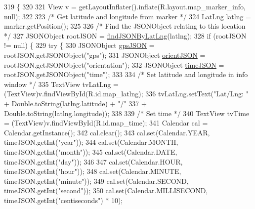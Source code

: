 \begin{DoxyCode}
319                                                    \{
320 
321             View v =  getLayoutInflater().inflate(R.layout.map\_marker\_info, null);
322 
323             \textcolor{comment}{/* Get latitude and longitude from marker */}
324             LatLng latlng = marker.getPosition();
325 
326             \textcolor{comment}{/* Find the JSONObject relating to this location */}
327             JSONObject rootJSON = \hyperlink{class_android_app_1_1_maps_activity_a18364d9334710362b1e6c39502353927}{findJSONByLatLng}(latlng);
328             \textcolor{keywordflow}{if} (rootJSON != null) \{
329                 \textcolor{keywordflow}{try} \{
330                     JSONObject \hyperlink{logging-device_8ino_a548727e041a5cd3db91bdbd0ccd71e30}{gpsJSON} = rootJSON.getJSONObject(\textcolor{stringliteral}{"gps"});
331                     JSONObject \hyperlink{logging-device_8ino_ae8e95a76df2aaa373792e5b744a6bb73}{orientJSON} = rootJSON.getJSONObject(\textcolor{stringliteral}{"orientation"});
332                     JSONObject \hyperlink{logging-device_8ino_acc172a29cb5ff709b48b650d9fb6503c}{timeJSON} = rootJSON.getJSONObject(\textcolor{stringliteral}{"time"});
333 
334                     \textcolor{comment}{/* Set latitude and longitude in info window */}
335                     TextView tvLatLng = (TextView)v.findViewById(R.id.map\_latlng);
336                     tvLatLng.setText(\textcolor{stringliteral}{"Lat/Lng: "} + Double.toString(latlng.latitude) + \textcolor{stringliteral}{"/"}
337                             + Double.toString(latlng.longitude));
338 
339                     \textcolor{comment}{/* Set time */}
340                     TextView tvTime = (TextView)v.findViewById(R.id.map\_time);
341                     Calendar cal = Calendar.getInstance();
342                     cal.clear();
343                     cal.set(Calendar.YEAR, timeJSON.getInt(\textcolor{stringliteral}{"year"}));
344                     cal.set(Calendar.MONTH, timeJSON.getInt(\textcolor{stringliteral}{"month"}));
345                     cal.set(Calendar.DATE, timeJSON.getInt(\textcolor{stringliteral}{"day"}));
346 
347                     cal.set(Calendar.HOUR, timeJSON.getInt(\textcolor{stringliteral}{"hour"}));
348                     cal.set(Calendar.MINUTE, timeJSON.getInt(\textcolor{stringliteral}{"minute"}));
349                     cal.set(Calendar.SECOND, timeJSON.getInt(\textcolor{stringliteral}{"second"}));
350                     cal.set(Calendar.MILLISECOND, timeJSON.getInt(\textcolor{stringliteral}{"centiseconds"}) * 10);

\end{DoxyCode}
